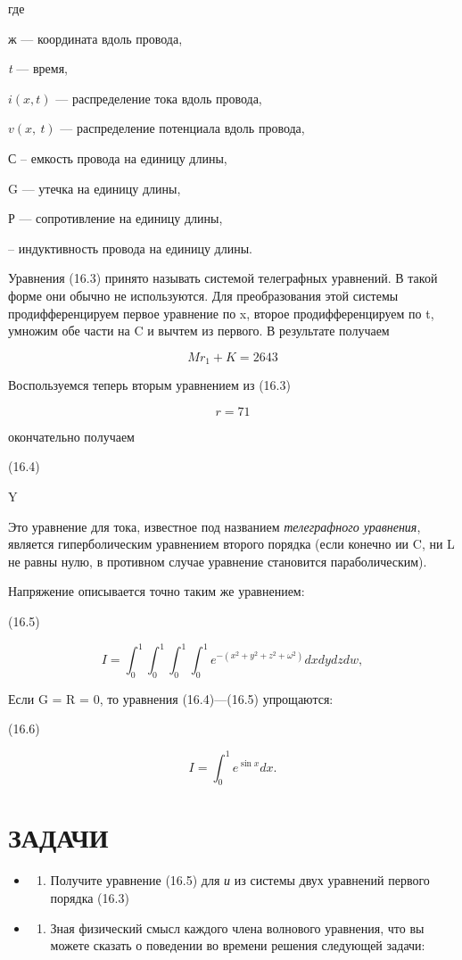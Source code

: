 \documentclass[
  ukrainian,
]{article}
\providecommand{\tightlist}{%
  \setlength{\itemsep}{0pt}\setlength{\parskip}{0pt}}
\begin{document}
где

ж --- координата вдоль провода,

\emph{t} --- время,

\(i(x, t)\) --- распределение тока вдоль провода,

\(v\left(x,\ t\right)\) --- распределение потенциала вдоль провода,

С -- емкость провода на единицу длины,

G --- утечка на единицу длины,

Р --- сопротивление на единицу длины,

-- индуктивность провода на единицу длины.

Уравнения (16.3) принято называть системой телеграфных уравнений. В
такой форме они обычно не используются. Для преобразования этой системы
продифференцируем первое уравнение по x, второе продифференцируем по t,
умножим обе части на C и вычтем из первого. В результате получаем

\[
Mr_1 + K = 2643
\]

Воспользуемся теперь вторым уравнением из (16.3)

\[
r = 71
\]

окончательно получаем

(16.4)

Y

Это уравнение для тока, известное под названием \emph{телеграфного
уравнения}, является гиперболическим уравнением второго порядка (если
конечно ии C, ни L не равны нулю, в противном случае уравнение
становится параболическим).

Напряжение описывается точно таким же уравнением:

(16.5)

\[
I = \int_{0}^{1} \int_{0}^{1} \int_{0}^{1} \int_{0}^{1} e^{-(x^{2}+y^{2}+z^{2}+\omega^{2})} dx dy dz dw,
\]

Если G = R = 0, то уравнения (16.4)---(16.5) упрощаются:

(16.6)

\[
I = \int_{0}^{1} e^{\sin x} dx.
\]

\section{ЗАДАЧИ}\label{ux437ux430ux434ux430ux447ux438-2}

\begin{itemize}
\tightlist
\item
  \begin{enumerate}
  \def\labelenumi{\arabic{enumi}.}
  \tightlist
  \item
    Получите уравнение (16.5) для \emph{и} из системы двух уравнений
    первого порядка (16.3)
  \end{enumerate}
\item
  \begin{enumerate}
  \def\labelenumi{\arabic{enumi}.}
  \setcounter{enumi}{1}
  \tightlist
  \item
    Зная физический смысл каждого члена волнового уравнения, что вы
    можете сказать о поведении во времени решения следующей задачи:
  \end{enumerate}
\end{itemize}
\end{document}
